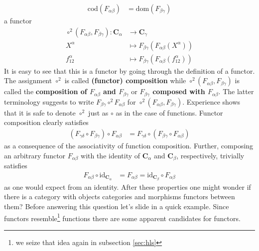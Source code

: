 \begin{align*}
  \mathrm{cod}(F_{\alpha\beta})
  &=
  \mathrm{dom}(F_{\beta\gamma})
\end{align*}
a functor
\begin{align*}
  \circ^{2}(F_{\alpha\beta},F_{\beta\gamma})
  \colon
  \mathbf{C}_{\alpha}
  &\rightarrow
  \mathbf{C}_{\gamma}
  \\
  X^{\alpha}
  &\mapsto
  F_{\beta\gamma}(F_{\alpha\beta}(X^{\alpha}))
  \\
  f_{12}^{\alpha}
  &\mapsto
  F_{\beta\gamma}(F_{\alpha\beta}(f_{12}^{\alpha}))
\end{align*}
It is easy to see that this is a functor by going through the definition of a functor. The assignment $\circ^{2}$ is called \textbf{(functor) composition} while $\circ^{2}(F_{\alpha\beta},F_{\beta\gamma})$ is called the \textbf{composition of $F_{\alpha\beta}$ and $F_{\beta\gamma}$} or \textbf{$F_{\beta\gamma}$ composed with $F_{\alpha\beta}$}. The latter terminology suggests to write $F_{\beta\gamma} \circ^{2} F_{\alpha\beta}$ for $\circ^{2}(F_{\alpha\beta},F_{\beta\gamma})$. Experience shows that it is safe to denote $\circ^{2}$ just as $\circ$ as in the case of functions. Functor composition clearly satisfies
\begin{align*}
  \left(
    F_{\gamma\delta}
    \circ
    F_{\beta\gamma}
  \right)
  \circ
  F_{\alpha\beta}
  &=
  F_{\gamma\delta}
  \circ
  \left(
    F_{\beta\gamma}
    \circ
    F_{\alpha\beta}
  \right)
\end{align*}
as a consequence of the associativity of function composition. Further, composing an arbitrary functor $F_{\alpha\beta}$ with the identity of $\mathbf{C}_{\alpha}$ and $\mathbf{C}_{\beta}$, respectively, trivially satisfies
\begin{align*}
  F_{\alpha\beta}
  \circ
  \mathrm{id}_{\mathbf{C}_{\alpha}}
  &=
  F_{\alpha\beta}
  =
  \mathrm{id}_{\mathbf{C}_{\beta}}
  \circ
  F_{\alpha\beta}
\end{align*}
as one would expect from an identity. After these properties one might wonder if there is a category with objects categories and morphisms functors between them? Before answering this question let's slide in a quick example. Since functors resemble\footnote{we seize that idea again in subsection \ref{sec:hls}} functions there are some apparent candidates for functors.
\\

